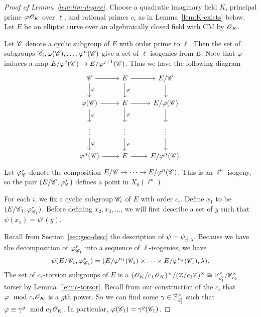 \documentclass{amsart}
\begin{document}
\begin{proof}[Proof of Lemma~\ref{lem:lim-degree}]
  Choose a quadratic imaginary field $K$, principal prime $\varphi\mathscr{O}_K$ over $\ell$, and rational primes $c_i$ as in Lemma~\ref{lem:K-exists} below. Let $E$ be an elliptic curve over an algebraically closed field with CM by $\mathscr{O}_K$.

  Let $\mathscr{C}$ denote a cyclic subgroup of $E$ with order prime to $\ell$. Then the set of subgroups $\mathscr{C}_i, \varphi(\mathscr{C}), \dots, \varphi^n(\mathscr{C})$ give a set of $\ell$-isogenies from $E$. Note that $\varphi$ induces a map $E/\varphi^j(\mathscr{C}) \to E/\varphi^{j+1}(\mathscr{C})$. Thus we have the following diagram
  \[
    \begin{tikzcd}
      \sC \arrow[d,"\varphi"] \arrow[r] & E \arrow[d,"\varphi"] \arrow[r] & E/\sC \arrow[d]
      \\
      \varphi(\sC) \arrow[d,"\varphi"] \arrow[r] & E \arrow[d,"\varphi"] \arrow[r] & E/\varphi(\sC) \arrow[d]
      \\
      \vdots \arrow[d,"\varphi"] & \vdots \arrow[d,"\varphi"] & \vdots \arrow[d]
      \\
      \varphi^n(\sC) \arrow[r] & E \arrow[r] & E/\varphi^{n}(\sC).
    \end{tikzcd}
  \]
  Let $\varphi^{\ast}_{\mathscr{C}}$ denote the composition $E/\mathscr{C} \to \cdots \to E/\varphi^n(\mathscr{C})$. This is an $\ell^n$-isogeny, so the pair $(E/\mathscr{C},\varphi^{\ast}_{\mathscr{C}})$ defines a point in $X_0(\ell^n)$.

  For each $i$, we fix a cyclic subgroup $\mathscr{C}_i$ of $E$ with order $c_i$. Define $x_1$ to be $(E/\mathscr{C}_1,\varphi^{\ast}_{\mathscr{C}_1})$. Before defining $x_2,x_3,\dots$, we will first describe a set of $y$ such that $\psi(x_1) = \psi'(y)$.

  Recall from Section~\ref{sec:geo-desc} the description of $\psi = \psi_{\vec{n},\lambda}$. Because we have the decomposition of $\varphi^{\ast}_{\mathscr{C}_1}$ into a sequence of $\ell$-isogenies, we have
  \[
    \psi(E/\mathscr{C}_1,\varphi^{\ast}_{\mathscr{C}_1}) = (E/\varphi^{n_1}(\mathscr{C}_1) \times \cdots \times E/\varphi^{n_g}(\mathscr{C}_1),\lambda).
  \]
  The set of $c_1$-torsion subgroups of $E$ is a $(\mathscr{O}_K/c_1\mathscr{O}_K)^\times/(\mathbb{Z}/c_1\mathbb{Z})^\times \cong \mathbb{F}_{c_1^2}^\times/\mathbb{F}_{c_1}^\times$ torser by Lemma~\ref{lem:c-torsor}. Recall from our construction of the $c_i$ that $\varphi \mod{c_i\mathscr{O}_K}$ is a $g$th power. So we can find some $\gamma \in \mathbb{F}_{c_1^2}^\times$ such that $\varphi \equiv \gamma^g \mod{c_1\mathscr{O}_K}$. In particular, $\varphi(\mathscr{C}_1) = \gamma^g(\mathscr{C}_1)$.


\end{proof}
\end{document}
